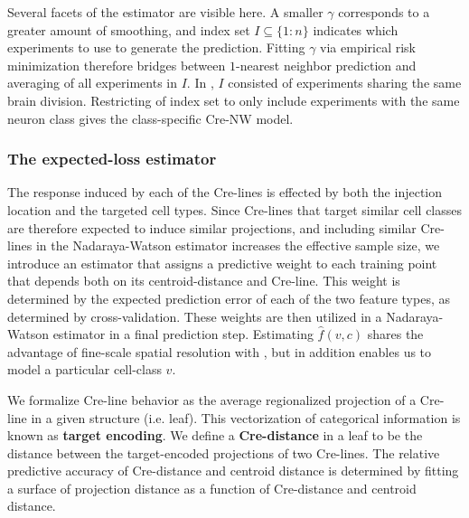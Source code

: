 Several facets of the estimator are visible here. %
A smaller $\gamma$ corresponds to a greater amount of smoothing, and index set $I \subseteq  \{1:n\}$ indicates which experiments to use to generate the prediction.
Fitting $\gamma$ via empirical risk minimization therefore bridges between $1$-nearest neighbor prediction and averaging of all experiments in $I$.
In \citet{Knox2019-ot}, $I$ consisted of experiments sharing the same brain division.
Restricting of index set to only include experiments with the same neuron class gives the class-specific Cre-NW model.

\newpage
\subsubsection{The expected-loss estimator}

\label{supp_sec:el}

The response induced by each of the Cre-lines is effected by both the injection location and the targeted cell types.
Since Cre-lines that target similar cell classes are therefore expected to induce similar projections, and including similar Cre-lines in the Nadaraya-Watson estimator increases the effective sample size, we introduce an estimator that assigns a predictive weight to each training point that depends both on its centroid-distance and Cre-line.
This weight is determined by the expected prediction error of each of the two feature types, as determined by cross-validation.
These weights are then utilized in a Nadaraya-Watson estimator in a final prediction step.
Estimating $\hat f(v, c)$ shares the advantage of fine-scale spatial resolution with \citet{Knox2019-ot}, but in addition enables us to model a particular cell-class $v$.

We formalize Cre-line behavior as the average regionalized projection of a Cre-line in a given structure (i.e. leaf).
This vectorization of categorical information is known as \textbf{target encoding}.
We define a \textbf{Cre-distance} in a leaf to be the distance between the target-encoded projections of two Cre-lines.
The relative predictive accuracy of Cre-distance and centroid distance is determined by fitting a surface of projection distance as a function of Cre-distance and centroid distance. 

